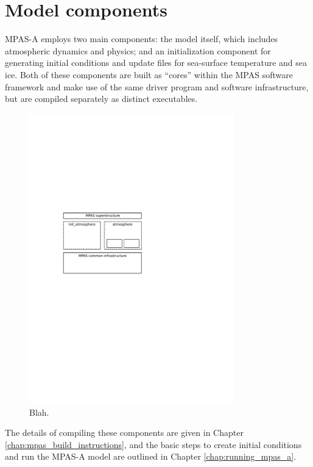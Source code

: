 \section{Model components}

MPAS-A employs two main components: the model itself, which includes
atmospheric dynamics and physics; and an initialization component for
generating initial conditions and update files for sea-surface
temperature and sea ice. Both of these components are built as ``cores''
within the MPAS software framework and make use of the same driver
program and software infrastructure, but are compiled separately as
distinct executables. 

\begin{figure}[htb]
\begin{center}
\includegraphics[width=3.5in]{atmosphere/figures/mpas-a_components.pdf}
\caption{Blah.}
\label{fig:atm_components}
\end{center}
\end{figure}

The details of compiling these components are given in Chapter
\ref{chap:mpas_build_instructions}, and the basic steps to create initial
conditions and run the MPAS-A model are outlined in Chapter
\ref{chap:running_mpas_a}.
